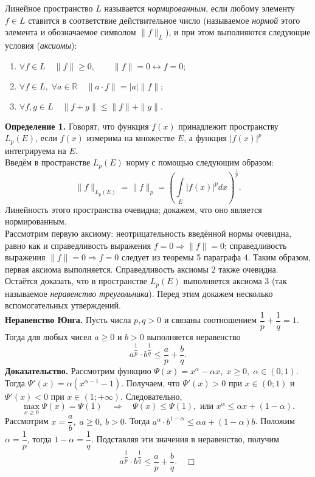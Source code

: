 \documentclass[12pt,a4paper, titlepage]{article}
\begin{document}
Линейное пространство $L$ называется \textit{нормированным}, если любому элементу $f \in L$ ставится в соответствие действительное число (называемое \textit{нормой} этого элемента и обозначаемое символом $\|f\|_L$), и при этом выполняются следующие условия (\textit{аксиомы}):
\begin{enumerate}
\item $\forall f \in L \quad \|f\| \geqslant 0, \qquad \|f\| = 0 \leftrightarrow f = 0;$

\item $\forall f \in L, \; \forall a \in \mathbb{R} \quad \|a \cdot f\| = |a| \|f\|;$

\item $\forall f, g \in L \quad \|f + g\| \leqslant \|f\| + \|g\|.$
\end{enumerate}

\textbf{Определение 1.} Говорят, что функция $f(x)$ принадлежит пространству $L_p(E)$, если $f(x)$ измерима на множестве $E$, а функция $|f(x)|^p$ интегрируема на $E$.\\

Введём в пространстве $L_p(E)$ норму с помощью следующим образом:
$$
\|f\|_{L_p(E)} = \|f\|_p = \left( \int\limits_E |f(x)|^p dx \right)^{\frac 1 p}.
$$
Линейность этого пространства очевидна; докажем, что оно является нормированным.\\

Рассмотрим первую аксиому: неотрицательность введённой нормы очевидна, равно как и справедливость выражения $f = 0 \Rightarrow \|f\| = 0$; справедливость выражения $\|f\| = 0 \Rightarrow f = 0$ следует из теоремы 5 параграфа 4. Таким образом, первая аксиома выполняется. Справедливость аксиомы 2 также очевидна. Остаётся доказать, что в пространстве $L_p(E)$ выполняется аксиома 3 (так называемое \textit{неравенство треугольника}). Перед этим докажем несколько вспомогательных утверждений.\\

\textbf{Неравенство Юнга.} Пусть числа $p, q > 0$ и связаны соотношением $\dfrac 1 p + \dfrac 1 q = 1$. Тогда для любых чисел $a \geqslant 0$ и $b > 0$ выполняется неравенство
$$
a^{\dfrac 1 p} \cdot b^{\dfrac 1 q} \leqslant \frac a p + \frac b q.
$$
\textbf{Доказательство.} Рассмотрим функцию $\Psi(x) = x^\alpha - \alpha x, \; x \geqslant 0, \; \alpha \in (0, 1)$. Тогда $\Psi'(x) = \alpha(x^{\alpha - 1} - 1)$. Получаем, что $\Psi'(x) > 0$ при $x \in (0; 1)$ и  $\Psi'(x) < 0$ при $x \in (1; +\infty)$. Следовательно,
$$
\max\limits_{x \geqslant 0} \Psi(x) = \Psi(1) \quad \Rightarrow \quad \Psi(x) \leqslant \Psi(1), \mbox{ или } x^\alpha \leqslant \alpha x + (1 - \alpha).
$$
Рассмотрим $x = \dfrac a b, \; a \geqslant 0, \ b > 0$. Тогда $a^\alpha \cdot b^{1-\alpha } \leqslant \alpha a + (1 - \alpha ) b$.
Положим $\alpha = \dfrac 1 p$, тогда $1 - \alpha = \dfrac 1 q$. Подставляя эти значения в неравенство, получим
$$
a^{\dfrac 1 p} \cdot b^{\dfrac 1 q} \leqslant \frac a p + \frac b q. \quad \Box
$$
\end{document}
